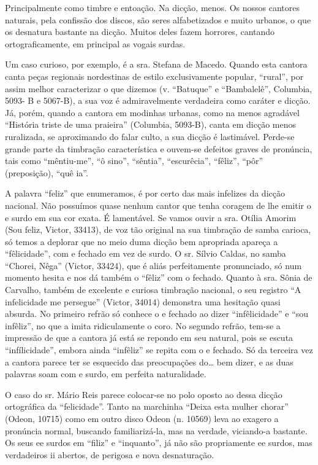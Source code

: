 Principalmente como timbre e entoação. Na dicção, menos. Os nossos
cantores naturais, pela confissão dos discos, são seres alfabetizados e
muito urbanos, o que os desnatura bastante na dicção. Muitos deles fazem
horrores, cantando ortograficamente, em principal as vogais surdas.

Um caso curioso, por exemplo, é a sra. Stefana de Macedo. Quando esta
cantora canta peças regionais nordestinas de estilo exclusivamente
popular, ``rural'', por assim melhor caracterizar o que dizemos (v.
``Batuque'' e ``Bambalelê'', Columbia, 5093- B e 5067-B), a sua voz é
admiravelmente verdadeira como caráter e dicção. Já, porém, quando a
cantora em modinhas urbanas, como na menos agradável ``História triste
de uma praieira'' (Columbia, 5093-B), canta em dicção menos ruralizada,
se aproximando do falar culto, a sua dicção é lastimável. Perde-se
grande parte da timbração característica e ouvem-se defeitos graves de
pronúncia, tais como ``mêntiu-me'', ``ô sino'', ``sêntia'',
``escurêcia'', ``fêliz'', ``pôr'' (preposição), ``quê ia''.

A palavra ``feliz'' que enumeramos, é por certo das mais infelizes da
dicção nacional. Não possuímos quase nenhum cantor que tenha coragem de
lhe emitir o e surdo em sua cor exata. É lamentável. Se vamos ouvir a
sra. Otília Amorim (Sou feliz, Victor, 33413), de voz tão original na
sua timbração de samba carioca, só temos a deplorar que no meio duma
dicção bem apropriada apareça a ``fêlicidade'', com e fechado em vez de
surdo. O sr. Sílvio Caldas, no samba ``Chorei, Nêga'' (Victor, 33424),
que é aliás perfeitamente pronunciado, só num momento hesita e nos dá
também o ``fêliz'' com o fechado. Quanto à sra. Sônia de Carvalho,
também de excelente e curiosa timbração nacional, o seu registro ``A
infelicidade me persegue'' (Victor, 34014) demonstra uma hesitação quasi
absurda. No primeiro refrão só conhece o e fechado ao dizer
``infêlicidade'' e ``sou infêliz'', no que a imita ridiculamente o coro.
No segundo refrão, tem-se a impressão de que a cantora já está se
repondo em seu natural, pois se escuta ``infílicidade'', embora ainda
``infêliz'' se repita com o e fechado. Só da terceira vez a cantora
parece ter se esquecido das preocupações do\ldots{} bem dizer, e as duas
palavras soam com e surdo, em perfeita naturalidade.

O caso do sr. Mário Reis parece colocar-se no polo oposto ao dessa
dicção ortográfica da ``felicidade''. Tanto na marchinha ``Deixa esta
mulher chorar'' (Odeon, 10715) como em outro disco Odeon (n. 10569) leva
ao exagero a pronúncia normal, buscando familiarizá-la, mas na verdade,
viciando-a bastante. Os seus ee surdos em ``filiz'' e ``inquanto'', já
não são propriamente ee surdos, mas verdadeiros ii abertos, de perigosa
e nova desnaturação.

